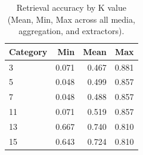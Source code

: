 \begin{table}[ht]
\centering
\caption{Retrieval accuracy by K value (Mean, Min, Max across all media, aggregation, and extractors).}
\label{tab:by_k}
\small
\begin{tabular}{@{}lrrr@{}}
\toprule
Category & Min & Mean & Max \\
\midrule
3 & 0.071 & 0.467 & 0.881 \\
5 & 0.048 & 0.499 & 0.857 \\
7 & 0.048 & 0.488 & 0.857 \\
11 & 0.071 & 0.519 & 0.857 \\
13 & 0.667 & 0.740 & 0.810 \\
15 & 0.643 & 0.724 & 0.810 \\
\bottomrule
\end{tabular}
\end{table}
